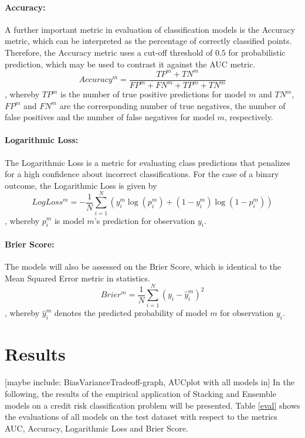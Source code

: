 \documentclass[12pt]{article}
\begin{document}
\paragraph{Accuracy:} A further important metric in evaluation of classification models is the Accuracy metric, which can be interpreted as the percentage of correctly classified points. Therefore, the Accuracy metric uses a cut-off threshold of $0.5$ for probabilistic prediction, which may be used to contrast it against the AUC metric.
\begin{equation}
Accuracy^m = \frac{TP^m + TN^m}{FP^m + FN^m + TP^m + TN^m}
\end{equation}
, whereby $TP^m$ is the number of true positive predictions for model $m$ and $TN^m$, $FP^m$ and $FN^m$ are the corresponding number of true negatives, the number of false positives and the number of false negatives for model $m$, respectively.

\paragraph{Logarithmic Loss:} The Logarithmic Loss is a metric for evaluating class predictions that penalizes for a high confidence about incorrect classifications. For the case of a binary outcome, the Logarithmic Loss is given by\\
\begin{equation}
LogLoss^m = - \frac{1}{N}\sum_{i=1}^{N}(y^m_i\log(p^m_i) + (1 - y^m_i)\log(1 - p^m_i))
\end{equation}
, whereby $p^m_i$ is model $m$'s prediction for observation $y_i$.

\paragraph{Brier Score:} The models will also be assessed on the Brier Score, which is identical to the Mean Squared Error metric in statistics.
\begin{equation}
Brier^m = \frac{1}{N}\sum_{i=1}^{N}(y_i - \hat{y}^m_i)^2
\end{equation}
, whereby $\hat{y}^m_i$ denotes the predicted probability of model $m$ for observation $y_i$. 


\section{Results}\label{results}
[maybe include: BiasVarianceTradeoff-graph, AUCplot with all models in]
In the following, the results of the empirical application of Stacking and Ensemble models on a credit risk classification problem will be presented. Table \ref{eval} shows the evaluations of all models on the test dataset with respect to the metrics AUC, Accuracy, Logarithmic Loss and Brier Score. 
\end{document}
